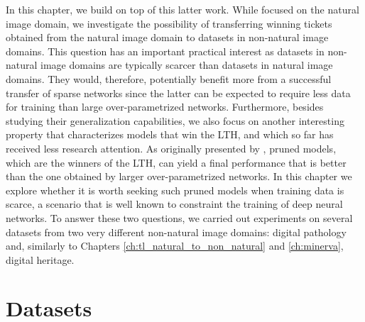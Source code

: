 In this chapter, we build on top of this latter work. While \citet{morcos2019one} focused on the natural image domain, we investigate the possibility of transferring winning tickets obtained from the natural image domain to datasets in non-natural image domains. This question has an important practical interest as datasets in non-natural image domains are typically scarcer than datasets in natural image domains. They would, therefore, potentially benefit more from a successful transfer of sparse networks since the latter can be expected to require less data for training than large over-parametrized networks. Furthermore, besides studying their generalization capabilities, we also focus on another interesting property that characterizes models that win the LTH, and which so far has received less research attention. As originally presented by \citet{frankle2018lottery}, pruned models, which are the winners of the LTH, can yield a final performance that is better than the one obtained by larger over-parametrized networks. In this chapter we explore whether it is worth seeking such pruned models when training data is scarce, a scenario that is well known to constraint the training of deep neural networks. To answer these two questions, we carried out experiments on several datasets from two very different non-natural image domains: digital pathology and, similarly to Chapters \ref{ch:tl_natural_to_non_natural} and \ref{ch:minerva}, digital heritage.

\section{Datasets}
\label{sec:datasets}

